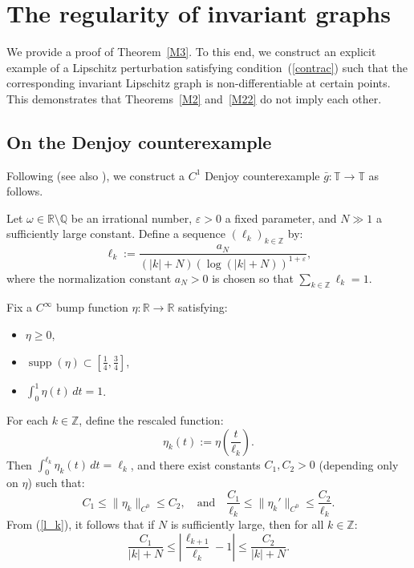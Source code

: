 \documentclass{amsart}
\newcommand{\eps}{\varepsilon}
\newcommand{\T}{\mathbb{T}}
\theoremstyle{definition}
\begin{document}
 \vspace{2em}

	\section{\sc The regularity of invariant graphs}\label{S5}
We provide a proof of Theorem~\ref{M3}. To this end, we construct an explicit example of a Lipschitz perturbation satisfying condition~(\ref{contrac}) such that the corresponding invariant Lipschitz graph is non-differentiable at certain points. This demonstrates that Theorems~\ref{M2} and~\ref{M22} do not imply each other.


\subsection{On the Denjoy counterexample}
Following \cite[Chapter X]{H11} (see also \cite{Ar11}), we construct a $C^1$ Denjoy counterexample $\bar{g}:\T\to\T$ as follows.

Let $\omega \in \mathbb{R}\setminus\mathbb{Q}$ be an irrational number, $\eps > 0$ a fixed parameter, and $N \gg 1$ a sufficiently large constant. Define a sequence $(\ell_k)_{k\in\mathbb{Z}}$ by:
\begin{equation}\label{l_k}
\ell_k := \frac{a_N}{(|k| + N)(\log(|k| + N))^{1+\eps}},
\end{equation}
where the normalization constant $a_N > 0$ is chosen so that $\sum_{k \in \mathbb{Z}} \ell_k = 1$.

Fix a $C^\infty$ bump function $\eta : \mathbb{R} \to \mathbb{R}$ satisfying:
\begin{itemize}
    \item $\eta \geq 0$,
    \item $\operatorname{supp}(\eta) \subset \left[\frac{1}{4}, \frac{3}{4}\right]$,
    \item $\int_0^1 \eta(t)\,dt = 1$.
\end{itemize}
For each $k \in \mathbb{Z}$, define the rescaled function:
\[
\eta_k(t) := \eta\left(\frac{t}{\ell_k}\right).
\]
Then $\int_0^{\ell_k} \eta_k(t)\,dt = \ell_k$, and there exist constants $C_1, C_2 > 0$ (depending only on $\eta$) such that:
\[
C_1 \leq \|\eta_k\|_{C^0} \leq C_2, \quad \text{and} \quad \frac{C_1}{\ell_k} \leq \|\eta_k'\|_{C^0} \leq \frac{C_2}{\ell_k}.
\]
From (\ref{l_k}), it follows that if $N$ is sufficiently large, then for all $k \in \mathbb{Z}$:
\begin{equation}\label{del_k}
\frac{C_1}{|k| + N} \leq \left|\frac{\ell_{k+1}}{\ell_k} - 1\right| \leq \frac{C_2}{|k| + N}.
\end{equation}
\end{document}
